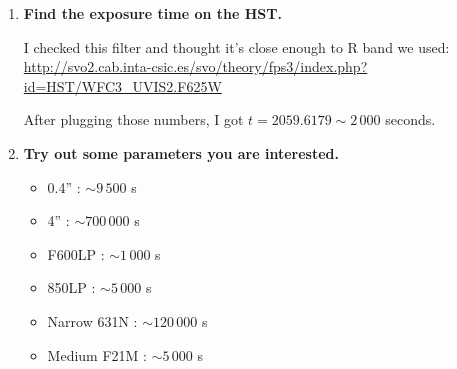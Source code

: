 \documentclass[12pt,letterpaper]{article}
\begin{document}
\begin{enumerate}
    \item {\bf Find the exposure time on the HST.}
    
    I checked this filter and thought it's close enough to R band we used:
    \url{http://svo2.cab.inta-csic.es/svo/theory/fps3/index.php?id=HST/WFC3_UVIS2.F625W}
    
    After plugging those numbers, I got $t = 2059.6179 \sim 2\,000$ seconds. 
    
    \item {\bf Try out some parameters you are interested.}
    
    \begin{itemize}
        \item  0.4'' : $\sim 9\,500$ s
        \item 4''    : $\sim 700\,000$ s
        \item F600LP : $\sim 1\,000$ s
        \item 850LP  : $\sim 5\,000$ s
        \item Narrow 631N : $\sim 120\,000$ s
        \item Medium F21M : $\sim 5\,000$ s
    \end{itemize}

\end{enumerate}
\end{document}
